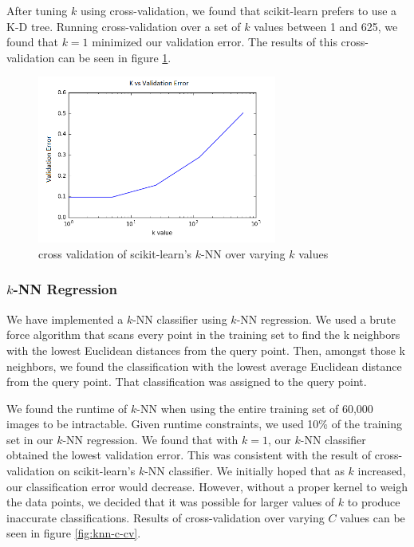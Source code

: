﻿\documentclass{article} %
\begin{document}
After tuning $k$ using cross-validation, we found that scikit-learn prefers to
use a K-D tree. Running cross-validation over a set of $k$ values between
1 and 625, we found that $k = 1$ minimized our validation error. The results of
this cross-validation can be seen in figure \ref{fig:sklearn-knn-k-cv}.

\begin{figure}[h]
\centering
\includegraphics[width=0.7\textwidth]{sklearn-knn-k-cv.png}
\caption{cross validation of scikit-learn's $k$-NN over varying $k$ values}
\label{fig:sklearn-knn-k-cv}
\end{figure}

\subsubsection{$k$-NN Regression}
We have implemented a $k$-NN classifier using
$k$-NN regression. We used a brute force algorithm that scans every point
in the training set to find the k neighbors with the lowest Euclidean distances from 
the query point. Then, amongst those k neighbors, we found the classification with the lowest
average Euclidean distance from the query point. That classification was assigned to the
query point.

We found the runtime of $k$-NN when using the entire training set of 60,000
images to be intractable. Given runtime constraints,
we used 10\% of the training set in our $k$-NN regression.
We found that with $k = 1$, our $k$-NN classifier obtained the lowest validation
error. This was consistent with the result of cross-validation on
scikit-learn's
$k$-NN classifier. 
We initially hoped that as $k$
increased, our classification error would decrease. However, without a
proper kernel to weigh the data points, we decided that it was possible for
larger values of $k$ to produce inaccurate classifications.
Results of cross-validation over varying $C$ values can be seen in figure \ref{fig:knn-c-cv}.
\end{document}
